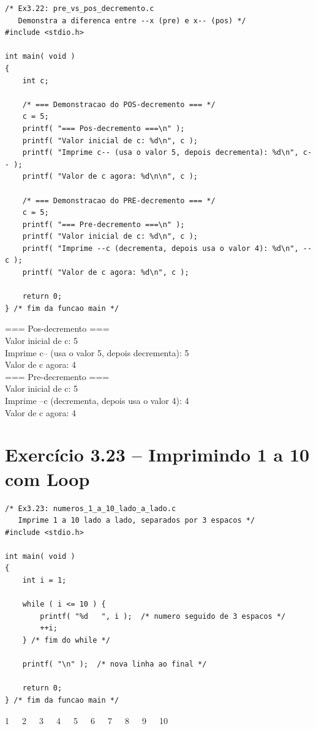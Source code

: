 \documentclass[12pt,a4paper]{article}
\begin{document}
\begin{respostabox}
\begin{lstlisting}
/* Ex3.22: pre_vs_pos_decremento.c
   Demonstra a diferenca entre --x (pre) e x-- (pos) */
#include <stdio.h>

int main( void )
{
    int c;

    /* === Demonstracao do POS-decremento === */
    c = 5;
    printf( "=== Pos-decremento ===\n" );
    printf( "Valor inicial de c: %d\n", c );
    printf( "Imprime c-- (usa o valor 5, depois decrementa): %d\n", c-- );
    printf( "Valor de c agora: %d\n\n", c );

    /* === Demonstracao do PRE-decremento === */
    c = 5;
    printf( "=== Pre-decremento ===\n" );
    printf( "Valor inicial de c: %d\n", c );
    printf( "Imprime --c (decrementa, depois usa o valor 4): %d\n", --c );
    printf( "Valor de c agora: %d\n", c );

    return 0;
} /* fim da funcao main */
\end{lstlisting}

\begin{saida}
=== Pos-decremento ===\\
Valor inicial de c: 5\\
Imprime c-- (usa o valor 5, depois decrementa): 5\\
Valor de c agora: 4\\[4pt]
=== Pre-decremento ===\\
Valor inicial de c: 5\\
Imprime --c (decrementa, depois usa o valor 4): 4\\
Valor de c agora: 4
\end{saida}
\end{respostabox}

\section{Exercício 3.23 -- Imprimindo 1 a 10 com Loop}

\begin{respostabox}
\begin{lstlisting}
/* Ex3.23: numeros_1_a_10_lado_a_lado.c
   Imprime 1 a 10 lado a lado, separados por 3 espacos */
#include <stdio.h>

int main( void )
{
    int i = 1;

    while ( i <= 10 ) {
        printf( "%d   ", i );  /* numero seguido de 3 espacos */
        ++i;
    } /* fim do while */

    printf( "\n" );  /* nova linha ao final */

    return 0;
} /* fim da funcao main */
\end{lstlisting}

\begin{saida}
1\ \ \ 2\ \ \ 3\ \ \ 4\ \ \ 5\ \ \ 6\ \ \ 7\ \ \ 8\ \ \ 9\ \ \ 10
\end{saida}
\end{respostabox}
\end{document}
